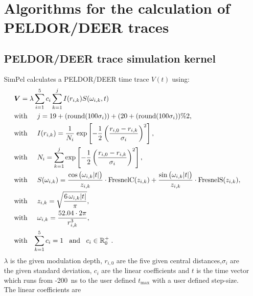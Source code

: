 \documentclass[pdftex,bezier,german,a4,twoside, headexclude,12pt,nochapterprefix, titlepage]{extarticle}
\newcommand{\simpel}{\textsf{SimPel} }
\begin{document}
\section{Algorithms for the calculation of PELDOR/DEER traces}
\subsection{PELDOR/DEER trace simulation kernel}
\simpel calculates a PELDOR/DEER time trace $V(t)$ using:
\begin{align}
\begin{split}
& \boldsymbol{V}=  \lambda \sum_{i=1}^5 c_i\sum_{k=1}^{j}I(r_{i,k})S(\omega_{i,k},t) \\
&\mbox{with}\hspace{0.5cm} j =  19+(\mathrm{round}(100\sigma_i)) + (20+(\mathrm{round}(100\sigma_i))\%2,\\
&\mbox{with}\hspace{0.5cm} I(r_{i,k}) =\dfrac{1}{N_{i}} \;
\mathrm{exp}\left[-\frac{1}{2}\left(\frac{r_{i,0}-r_{i,k}}{\sigma_i}\right)^2\right],\\
&\mbox{with}\hspace{0.5cm} N_{i} = \sum_{k=1}^{j}\mathrm{exp}\left[-\frac{1}{2}\left(\frac{r_{i,0}-r_{i,k}}{\sigma_i}\right)^2\right] ,\\
&\mbox{with}\hspace{0.5cm}S(\omega_{i,k}) = 
\frac{\cos{\big(\omega_{i,k}|t| \big)}}{z_{i,k}} \cdot \text{FresnelC}(z_{i,k})  + 
   \frac{\sin{\big(\omega_{i,k} |t|\big)}}{z_{i,k}} \cdot \text{FresnelS}(z_{i,k}),\\
  &\mbox{with}\hspace{0.5cm}  z_{i,k} = \sqrt{\frac{6\,\omega_{i,k} |t| }{\pi}},\\
&\mbox{with}\hspace{0.5cm} \omega_{i,k} = \dfrac{52.04\cdot 2 \pi}{r_{i,k}^3},\\ 
&\mbox{with}\hspace{0.3cm} \sum_{k=1}^{5}c_i = 1 \hspace{0.3cm}
\mbox{and}\hspace{0.3cm}c_i \in\mathbb{R}^+_0\; .
\label{PELDOR_kernel_function}
\end{split}
\end{align}
$\lambda$ is the given modulation depth, $r_{i,0}$ are the five given central distances,$\sigma_i$ are
the given standard deviation, $c_i$ are the linear coefficients and $t$ is the time vector which runs
from -200~ns to the user defined $t_{\mathrm{max}}$ with a user defined step-size. The linear coefficients are
\end{document}
